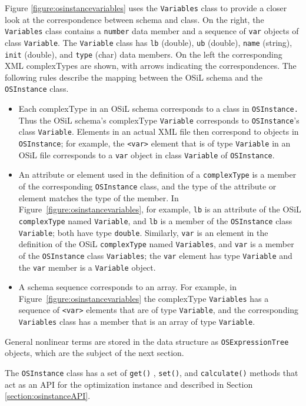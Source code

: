 \documentclass[11pt]{article}
\newcounter{Fig}
\renewcommand{\_}{{\char"5F}}
\renewcommand{\{}{{\char"7B}}
\renewcommand{\}}{{\char"7D}}
\renewcommand{\^}{{\char"0D}}
\renewcommand{\'}{{\char"0D}}
\newcommand{\Titem}{\item[$\triangleright$]}
\begin{document}
     Figure \ref{figure:osinstancevariables} uses the {\tt Variables} class to provide a closer look at the correspondence between schema and class. On the right, the {\tt Variables} class contains a {\tt number} data member and a sequence of {\tt var} objects of class {\tt Variable}. The {\tt Variable} class has {\tt lb} (double), {\tt ub} (double), {\tt name} (string), {\tt init} (double), and {\tt type} (char) data members. On the left the corresponding XML complexTypes are shown, with arrows indicating the correspondences. The following rules describe the mapping between the OSiL schema and the {\tt OSInstance} class. 
%
\begin{itemize}

\Titem  Each complexType in an OSiL schema corresponds to a class in {\tt OSInstance.} Thus the OSiL schema's complexType {\tt Variable} corresponds to {\tt OSInstance}'s class {\tt Variable}.  Elements in an actual XML file then correspond to objects in {\tt OSInstance}; for example, the {\tt <var>} element that is of type {\tt Variable} in an OSiL file corresponds to a {\tt var} object in class {\tt Variable} of {\tt OSInstance}.

\Titem An attribute or element used in the definition of a {\tt complexType} is a member of the corresponding {\tt OSInstance} class, and the type of the attribute or element matches the type of the member.  In Figure~\ref{figure:osinstancevariables}, for example, {\tt lb} is an attribute of the OSiL {\tt complexType} named {\tt Variable}, and {\tt lb} is a member of the {\tt OSInstance} class {\tt Variable}; both have type {\tt double}.  Similarly, {\tt var} is an element in the definition of the OSiL {\tt complexType} named {\tt Variables}, and {\tt var} is a member of the {\tt OSInstance} class {\tt Variables}; the {\tt var} element has type {\tt Variable} and the {\tt var} member is a {\tt Variable} object.

\Titem A schema sequence corresponds to an array. For example, in Figure~\ref{figure:osinstancevariables} the complexType {\tt Variables} has a sequence of {\tt <var>} elements that are of type {\tt Variable}, and the corresponding {\tt Variables} class has a member that is an array of type {\tt Variable}.

\end{itemize}
%
General nonlinear terms are stored in the data structure as {\tt OSExpressionTree} objects, which are the subject of the next section.

     The {\tt OSInstance} class has a set of {\tt get()} , {\tt set()}, and {\tt calculate()} methods that act as an API for the optimization instance and described in Section \ref{section:osinstanceAPI}. 
\end{document}
